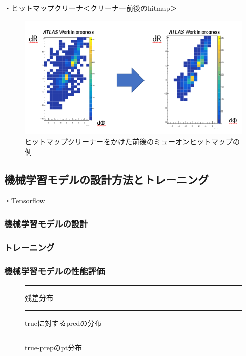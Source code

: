 ・ヒットマップクリーナ＜クリーナー前後のhitmap＞
\begin{figure}[tb]
  \centering
  \includegraphics[clip, width=14cm]{fig/4/cleaner.png}
  \caption{ヒットマップクリーナーをかけた前後のミューオンヒットマップの例}
  \label{fig:hitmapcleaner}
\end{figure}


\subsection{機械学習モデルの設計方法とトレーニング}
・Tensorflow\\
\subsubsection{機械学習モデルの設計}
\subsubsection{トレーニング}
\subsubsection{機械学習モデルの性能評価}
\begin{figure}[tb]
  \centering
  \rule{8cm}{6cm}
  \caption{残差分布}
  \label{fig:fit_def}
\end{figure}

\begin{figure}[tb]
  \centering
  \rule{8cm}{6cm}
  \caption{trueに対するpredの分布}
  \label{fig:fit_def}
\end{figure}

\begin{figure}[tb]
  \centering
  \rule{8cm}{6cm}
  \caption{true-prepのpt分布}
  \label{fig:fit_def}
\end{figure}


